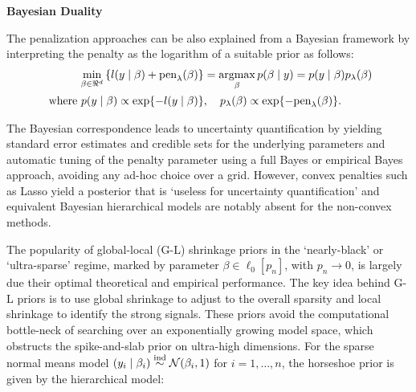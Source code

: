 \documentclass[10pt]{article}
\begin{document}

\noindent \textbf{Bayesian Duality} 

The penalization approaches can be also explained from a Bayesian framework by interpreting the penalty as the logarithm of a suitable prior as follows:
\begin{align}
 \min_{\beta \in \Re^d}
  \left\{
    l(y \mid \beta) + \text{pen}_{\lambda}(\beta) 
  \right\}
  & = \argmax_\beta p(\beta \mid y) = p(y \mid \beta) p_{\lambda}(\beta) \nonumber \\
	\text{ where } p(y \mid \beta) \propto \exp\{-l(y \mid \beta)\} & , \quad p_{\lambda}(\beta)
  \propto \exp\{ -\text{pen}_{\lambda}(\beta) \}. \label{eq:pen} \nonumber
\end{align}

The Bayesian correspondence leads to uncertainty quantification by yielding standard error estimates and credible sets for the underlying parameters and automatic tuning of the penalty parameter using a full Bayes or empirical Bayes approach, avoiding any ad-hoc choice over a grid. However, convex penalties such as Lasso yield a posterior that is `useless for uncertainty quantification' \citep{castillo2015bayesian} and equivalent Bayesian hierarchical models are notably absent for the non-convex methods. 

The popularity of global-local (G-L) shrinkage priors in the `nearly-black' or `ultra-sparse' regime, marked by parameter $\beta \in \ell_0[p_n]$, with $p_n \to 0$, is largely due their optimal theoretical and empirical performance. The key idea behind G-L priors is to use global shrinkage to adjust to the overall sparsity and local shrinkage to identify the strong signals. These priors avoid the computational bottle-neck of searching over an exponentially growing model space, which obstructs the spike-and-slab prior \citep{mitchell88} on ultra-high dimensions. For the sparse normal means model $(y_i \mid \beta_i)  \stackrel{\mathrm{ind}}{\sim} \mathcal{N} (\beta_i,1)$ for $i = 1, \ldots, n$, the horseshoe prior \citep{carvalho2010horseshoe} is given by the hierarchical model: 
\end{document}
